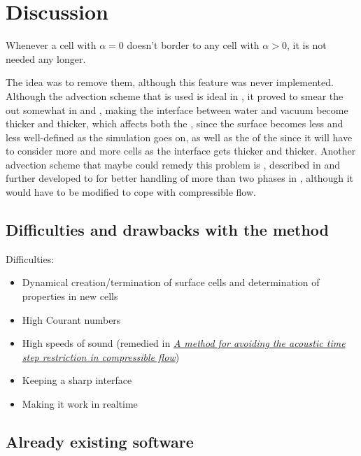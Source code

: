 \chapter{Discussion}

Whenever a cell with $\alpha = 0$ doesn't border to any cell with $\alpha > 0$, it is not needed any longer.

The idea was to remove them, although this feature was never implemented. Although the advection scheme that is used is ideal in , it proved to smear the  out somewhat in  and , making the interface between water and vacuum become thicker and thicker, which affects both the , since the surface becomes less and less well-defined as the simulation goes on, as well as the \performance of the  since it will have to consider more and more cells as the interface gets thicker and thicker. Another advection scheme that maybe could remedy this problem is \MULES, described in \citep{Berberovi2009} and further developed to for better handling of more than two phases in \citep{Kissling2010}, although it would have to be modified to cope with compressible flow.

\section{Difficulties and drawbacks with the method}

Difficulties:
\begin{itemize}
    \item Dynamical creation/termination of surface cells and determination of properties in new cells
    \item High Courant numbers
    \item High speeds of sound (remedied in \textit{\href{http://physbam.stanford.edu/~kwatra/papers/compressible_semi_implicit/compressible_semi_implicit.pdf}{A method for avoiding the acoustic time step restriction in compressible flow}})
    \item Keeping a sharp interface
    \item Making it work in realtime
\end{itemize}

\section{Already existing software}


